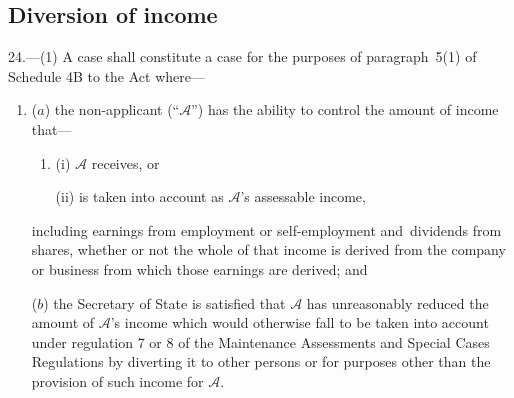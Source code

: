 \documentclass[12pt,a4paper]{article}
\begin{document}
\subsection[24. Diversion of income]{Diversion of income}

%

24.---(1)  A case shall constitute a case for the purposes of paragraph~5(1) of Schedule 4B to the Act where—
\begin{enumerate}\item[]
($a$) the non-applicant (“$\mathcal{A}$”) has the ability to control the amount of income that—
\begin{enumerate}\item[]
(i) $\mathcal{A}$ receives, or

(ii) is taken into account as $\mathcal{A}$’s assessable income,
\end{enumerate}
including earnings from employment or self-employment and~dividends from shares, whether or not the whole of that income is derived from the company or business from which those earnings are derived; and

($b$) the 
Secretary of State  %
is satisfied that $\mathcal{A}$ has unreasonably reduced the amount of $\mathcal{A}$’s income which would otherwise fall to be taken into account under regulation 7 or 8 of the Maintenance Assessments and Special Cases Regulations by diverting it to other persons or for purposes other than the provision of such income for $\mathcal{A}$.
\end{enumerate}
\end{document}
